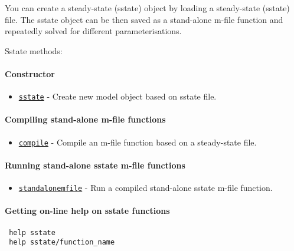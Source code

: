 

	You can create a steady-state (sstate) object by loading a steady-state
 (sstate) file. The sstate object can be then saved as a stand-alone
 m-file function and repeatedly solved for different parameterisations.
 
 Sstate methods:
 
 \paragraph{Constructor}
 
 \begin{itemize}
 \item
   \href{sstate/sstate}{\texttt{sstate}} - Create new model object based
   on sstate file.
 \end{itemize}
 
 \paragraph{Compiling stand-alone m-file functions}
 
 \begin{itemize}
 \item
   \href{sstate/compile}{\texttt{compile}} - Compile an m-file function
   based on a steady-state file.
 \end{itemize}
 
 \paragraph{Running stand-alone sstate m-file functions}
 
 \begin{itemize}
 \item
   \href{sstate/standalonemfile}{\texttt{standalonemfile}} - Run a
   compiled stand-alone sstate m-file function.
 \end{itemize}
 
 \paragraph{Getting on-line help on sstate functions}
 
 \begin{verbatim}
 help sstate
 help sstate/function_name
 \end{verbatim}



